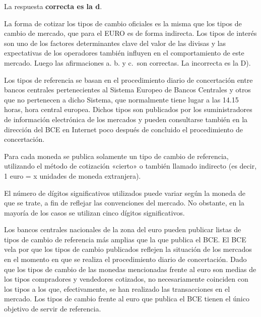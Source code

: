 \documentclass[
  letterpaper,
  DIV=11,
  numbers=noendperiod]{scrreprt}
\begin{document}
\begin{tcolorbox}[enhanced jigsaw, left=2mm, opacityback=0, colback=white, breakable, arc=.35mm, bottomrule=.15mm, rightrule=.15mm, toprule=.15mm, leftrule=.75mm, colframe=quarto-callout-tip-color-frame]
\begin{minipage}[t]{5.5mm}
\textcolor{quarto-callout-tip-color}{\faLightbulb}
\end{minipage}%
\begin{minipage}[t]{\textwidth - 5.5mm}

La respuesta \textbf{correcta es la d}.

La forma de cotizar los tipos de cambio oficiales es la misma que los
tipos de cambio de mercado, que para el EURO es de forma indirecta. Los
tipos de interés son uno de los factores determinantes clave del valor
de las divisas y las expectativas de los operadores también influyen en
el comportamiento de este mercado. Luego las afirmaciones a. b. y c.~son
correctas. La incorrecta es la D).

Los tipos de referencia se basan en el procedimiento diario de
concertación entre bancos centrales pertenecientes al Sistema Europeo de
Bancos Centrales y otros que no pertenecen a dicho Sistema, que
normalmente tiene lugar a las 14.15 horas, hora central europea. Dichos
tipos son publicados por los suministradores de información electrónica
de los mercados y pueden consultarse también en la dirección del BCE en
Internet poco después de concluido el procedimiento de concertación.

Para cada moneda se publica solamente un tipo de cambio de referencia,
utilizando el método de cotización «cierto» o también llamado indirecto
(es decir, 1 euro = x unidades de moneda extranjera).

El número de dígitos significativos utilizados puede variar según la
moneda de que se trate, a fin de reflejar las convenciones del mercado.
No obstante, en la mayoría de los casos se utilizan cinco dígitos
significativos.

Los bancos centrales nacionales de la zona del euro pueden publicar
listas de tipos de cambio de referencia más amplias que la que publica
el BCE. El BCE vela por que los tipos de cambio publicados reflejen la
situación de los mercados en el momento en que se realiza el
procedimiento diario de concertación. Dado que los tipos de cambio de
las monedas mencionadas frente al euro son medias de los tipos
compradores y vendedores cotizados, no necesariamente coinciden con los
tipos a los que, efectivamente, se han realizado las transacciones en el
mercado. Los tipos de cambio frente al euro que publica el BCE tienen el
único objetivo de servir de referencia.

\end{minipage}%
\end{tcolorbox}
\end{document}
